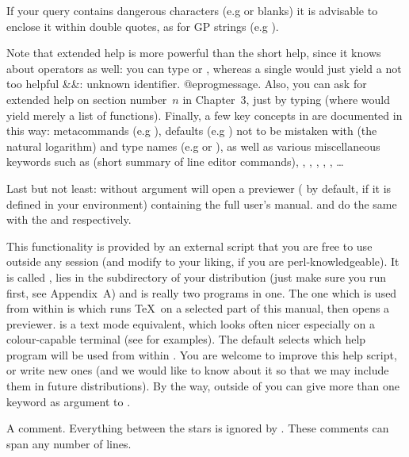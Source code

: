 If your query contains dangerous characters (e.g  or blanks) it is
advisable to enclose it within double quotes, as for GP strings (e.g
).

Note that extended help is more powerful than the short help, since
it knows about operators as well: you can type  or
, whereas a single  would just yield a not too helpful
\bprog
&&: unknown identifier.
@eprog\noindent message. Also, you can ask for extended help on section
number~$n$ in Chapter~3, just by typing  (where  would
yield merely a list of functions). Finally, a few key concepts in  are
documented in this way: metacommands (e.g ), defaults (e.g
) not to be mistaken with  (the natural
logarithm) and type names (e.g  or ), as well as
various miscellaneous keywords such as  (short summary of line
editor commands), , , ,
, , \dots

Last but not least:  without argument will open a 
previewer ( by default,  if it is defined in your
environment) containing the full user's manual.  and
 do the same with the  and 
respectively.

 This functionality is provided by an
external  script that you are free to use outside any  session
(and modify to your liking, if you are perl-knowledgeable). It is called
, lies in the  subdirectory of your distribution
(just make sure you run  first, see Appendix~A) and is
really two programs in one. The one which is used from within  is
 which runs \TeX\ on a selected part of this manual, then opens
a previewer.  is a text mode equivalent, which looks
often nicer especially on a colour-capable terminal (see
 for examples). The default  selects which
help program will be used from within . You are welcome to improve this
help script, or write new ones (and we would like to know about it
so that we may include them in future distributions). By the way, outside
of  you can give more than one keyword as argument to .

 A comment. Everything between the stars is ignored by
. These comments can span any number of lines.

